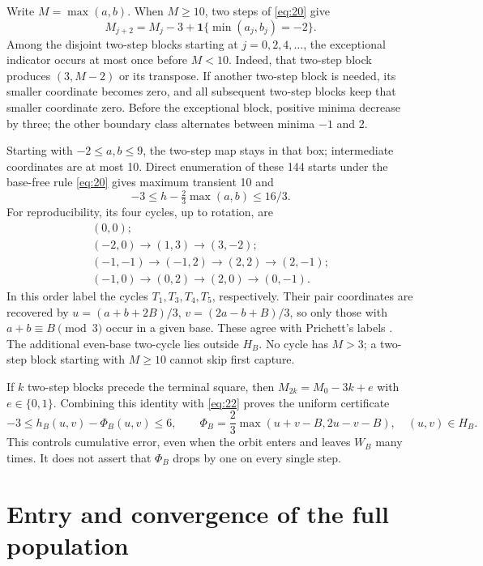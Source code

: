 \documentclass[11pt]{amsart}
\begin{document}
Write \(M=\max(a,b)\). When \(M\ge10\), two steps of \eqref{eq:20} give \begin{equation}\label{eq:21}
M_{j+2}=M_j-3+\mathbf1\{\min(a_j,b_j)=-2\}.
\end{equation} Among the disjoint two-step blocks starting at \(j=0,2,4,\ldots\), the exceptional indicator occurs at most once before \(M<10\). Indeed, that two-step block produces \((3,M-2)\) or its transpose. If another two-step block is needed, its smaller coordinate becomes zero, and all subsequent two-step blocks keep that smaller coordinate zero. Before the exceptional block, positive minima decrease by three; the other boundary class alternates between minima \(-1\) and 2.

Starting with \(-2\le a,b\le9\), the two-step map stays in that box; intermediate coordinates are at most 10. Direct enumeration of these 144 starts under the base-free rule \eqref{eq:20} gives maximum transient 10 and \begin{equation}\label{eq:22}
-3\le h-\tfrac23\max(a,b)\le16/3.
\end{equation} For reproducibility, its four cycles, up to rotation, are \[\begin{gathered}
 (0,0);\\
 (-2,0)\to(1,3)\to(3,-2);\\
 (-1,-1)\to(-1,2)\to(2,2)\to(2,-1);\\
 (-1,0)\to(0,2)\to(2,0)\to(0,-1).
\end{gathered}\] In this order label the cycles \(T_1,T_3,T_4,T_5\), respectively. Their pair coordinates are recovered by \(u=(a+b+2B)/3\), \(v=(2a-b+B)/3\), so only those with \(a+b\equiv B\pmod3\) occur in a given base. These agree with Prichett's labels \cite[Tables~4.1--4.3]{Pri}. The additional even-base two-cycle lies outside \(H_B\). No cycle has \(M>3\); a two-step block starting with \(M\ge10\) cannot skip first capture.

If \(k\) two-step blocks precede the terminal square, then \(M_{2k}=M_0-3k+e\) with \(e\in\{0,1\}\). Combining this identity with \eqref{eq:22} proves the uniform certificate \begin{equation}\label{eq:23}
-3\le h_B(u,v)-\Phi_B(u,v)\le6,\qquad
 \Phi_B=\frac23\max(u+v-B,2u-v-B),\quad (u,v)\in H_B.
\end{equation} This controls cumulative error, even when the orbit enters and leaves \(W_B\) many times. It does not assert that \(\Phi_B\) drops by one on every single step.

\section{Entry and convergence of the full population}
\end{document}
